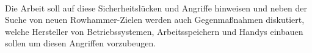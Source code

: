 \documentclass[a4paper]{article}
\begin{document}
\paragraph{}

Die Arbeit soll auf diese Sicherheitslücken und Angriffe hinweisen und neben
der Suche von neuen Rowhammer-Zielen werden auch Gegenmaßnahmen diskutiert,
welche Hersteller von Betriebssystemen, Arbeitsspeichern und Handys einbauen
sollen um diesen Angriffen vorzubeugen.

\pagebreak



\end{document}
